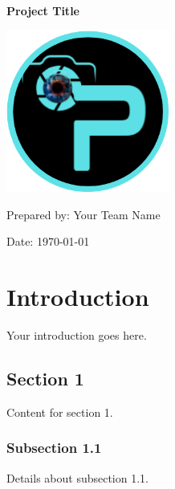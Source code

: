 \documentclass[a4paper,12pt]{report}
\begin{document}
\begin{titlepage}
    \centering
    \vspace*{1cm}
    {\Huge\bfseries Project Title \par}
    \vspace{1.5cm}
    \includegraphics[width=0.4\textwidth]{Pathpal-modified.png}\par
    \vspace{2cm}
    {\Large Prepared by: Your Team Name \par}
    \vfill
    {\large Date: \today \par}
\end{titlepage}

\tableofcontents

\chapter{Introduction}
Your introduction goes here.

\section{Section 1}
Content for section 1.

\subsection{Subsection 1.1}
Details about subsection 1.1.
\end{document}
